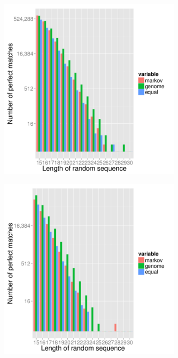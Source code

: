 \documentclass{article}
\begin{document}
\begin{figure}
\begin{subfigure}{.5\textwidth}
      \caption{}
      \label{fig:mm10_mapped_perfect}
   \end{subfigure}  
   \begin{subfigure}{.5\columnwidth}
      \centering
      \includegraphics[width=.9\textwidth,natwidth=100,natheight=100]{danRer7_perfect_mapped_1000000.pdf}
      \caption{}
      \label{fig:danRer7_mapped_perfect}
   \end{subfigure}%
   \begin{subfigure}{.5\columnwidth}
      \centering
      \includegraphics[width=.9\textwidth,natwidth=100,natheight=100]{ce10_perfect_mapped_1000000.pdf}
      \caption{}
      \label{fig:ce10_mapped_perfect}
   \end{subfigure}
   \caption{}
   \label{fig:mapped_perfect_statistic}
\end{figure}
\end{document}
